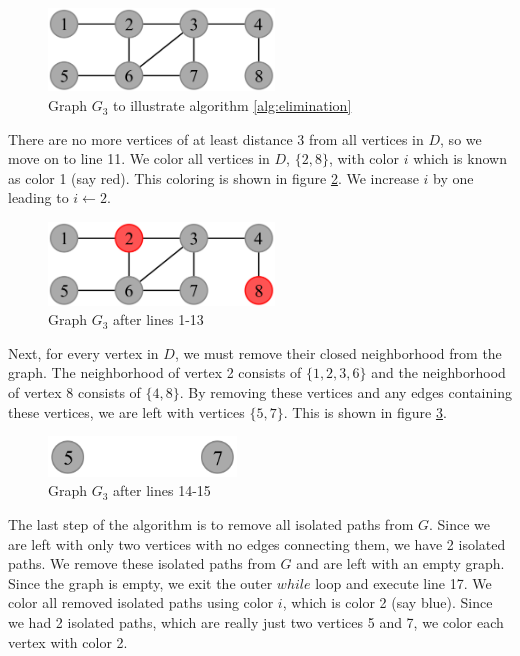 \documentclass{sig-alternate}
\begin{document}
\begin{figure}[h]
	\centering
	\includegraphics[width=6cm]{../figures/algorithm1.pdf}
	\caption{Graph $G_3$ to illustrate algorithm \ref{alg:elimination}}\label{fig:algorithm1}
\end{figure}

There are no more vertices of at least distance 3 from all vertices in $D$, so we move on to line 11. We color all vertices in $D$, $\{2,8\}$, with color $i$ which is known as color 1 (say red). This coloring is shown in figure \ref{fig:algorithm1-step1}. We increase $i$ by one leading to $i \gets 2$.

\begin{figure}[h]
	\centering
	\includegraphics[width=6cm]{../figures/algorithm1-step1.pdf}
	\caption{Graph $G_3$ after lines 1-13}\label{fig:algorithm1-step1}
\end{figure}

Next, for every vertex in $D$, we must remove their closed neighborhood from the graph. The neighborhood of vertex 2 consists of $\{1,2,3,6\}$ and the neighborhood of vertex 8 consists of $\{4,8\}$. By removing these vertices and any edges containing these vertices, we are left with vertices $\{5, 7\}$. This is shown in figure \ref{fig:algorithm1-step2}.

\begin{figure}[h]
	\centering
	\includegraphics[width=5cm]{../figures/algorithm1-step2.pdf}
	\caption{Graph $G_3$ after lines 14-15}\label{fig:algorithm1-step2}
\end{figure}

The last step of the algorithm is to remove all isolated paths from $G$. Since we are left with only two vertices with no edges connecting them, we have 2 isolated paths. We remove these isolated paths from $G$ and are left with an empty graph. Since the graph is empty, we exit the outer $while$ loop and execute line 17. We color all removed isolated paths using color $i$, which is color 2 (say blue). Since we had 2 isolated paths, which are really just two vertices 5 and 7, we color each vertex with color 2.
\end{document}

